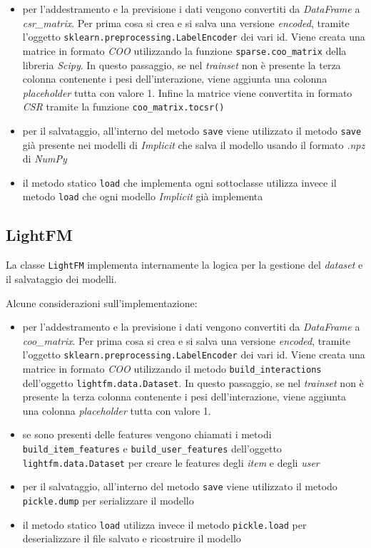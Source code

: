 \begin{itemize}
    \item per l'addestramento e la previsione i dati vengono convertiti da \textit{DataFrame} a \textit{csr\_matrix}. Per prima cosa si crea e si salva una versione \textit{encoded}, tramite l'oggetto \texttt{sklearn.preprocessing.LabelEncoder} dei vari id. Viene creata una matrice in formato \textit{COO} utilizzando la funzione \texttt{sparse.coo\_matrix} della libreria \textit{Scipy}. In questo passaggio, se nel \textit{trainset} non è presente la terza colonna contenente i pesi dell'interazione, viene aggiunta una colonna \textit{placeholder} tutta con valore 1. Infine la matrice viene convertita in formato \textit{CSR} tramite la funzione \texttt{coo\_matrix.tocsr()} 
    \item per il salvataggio, all'interno del metodo \texttt{save} viene utilizzato il metodo \texttt{save} già presente nei modelli di \textit{Implicit} che salva il modello usando il formato \textit{.npz} di \textit{NumPy}
    \item il metodo statico \texttt{load} che implementa ogni sottoclasse utilizza invece il metodo \texttt{load} che ogni modello \textit{Implicit} già implementa
\end{itemize}

\subsection{LightFM}

La classe \texttt{LightFM} implementa internamente la logica per la gestione del \textit{dataset} e il salvataggio dei modelli. 

Alcune considerazioni sull'implementazione:

\begin{itemize}
    \item per l'addestramento e la previsione i dati vengono convertiti da \textit{DataFrame} a \textit{coo\_matrix}. Per prima cosa si crea e si salva una versione \textit{encoded}, tramite l'oggetto \texttt{sklearn.preprocessing.LabelEncoder} dei vari id. Viene creata una matrice in formato \textit{COO} utilizzando il metodo \texttt{build\_interactions} dell'oggetto \texttt{lightfm.data.Dataset}. In questo passaggio, se nel \textit{trainset} non è presente la terza colonna contenente i pesi dell'interazione, viene aggiunta una colonna \textit{placeholder} tutta con valore 1. 
    \item se sono presenti delle features vengono chiamati i metodi \\ \texttt{build\_item\_features} e \texttt{build\_user\_features} dell'oggetto \\ \texttt{lightfm.data.Dataset} per creare le features degli \textit{item} e degli \textit{user}
    \item per il salvataggio, all'interno del metodo \texttt{save} viene utilizzato il metodo \texttt{pickle.dump} per serializzare il modello
    \item il metodo statico \texttt{load} utilizza invece il metodo \texttt{pickle.load} per deserializzare il file salvato e ricostruire il modello
\end{itemize}

